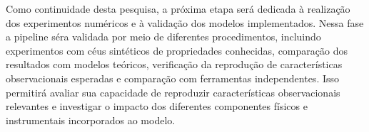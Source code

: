 Como continuidade desta pesquisa, a próxima etapa será dedicada à realização dos experimentos numéricos e à validação  dos modelos implementados. Nessa fase a  pipeline séra validada por meio de diferentes procedimentos, incluindo experimentos com céus sintéticos de propriedades conhecidas, comparação dos resultados com modelos teóricos, verificação da reprodução de características observacionais esperadas e comparação com ferramentas independentes. Isso permitirá avaliar sua capacidade de reproduzir características observacionais relevantes e investigar o impacto dos diferentes componentes físicos e instrumentais incorporados ao modelo.


